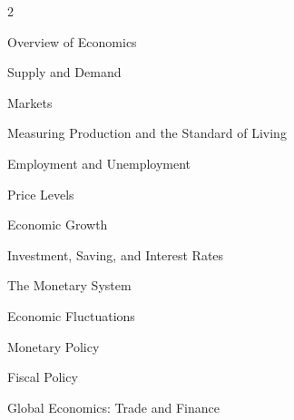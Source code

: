 \begin{multicols}{2}
\begin{ul}
    \item Overview of Economics
    \item Supply and Demand
    \item Markets
    \item Measuring Production and the Standard of Living
    \item Employment and Unemployment
    \item Price Levels
    \item Economic Growth
    \item Investment, Saving, and Interest Rates
    \item The Monetary System
    \item Economic Fluctuations
    \item Monetary Policy
    \item Fiscal Policy
    \item Global Economics: Trade and Finance
\end{ul}
\end{multicols}
